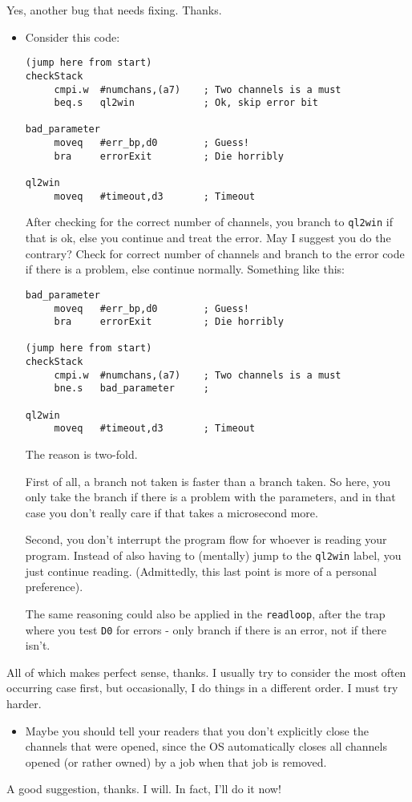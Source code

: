 Yes, another bug that needs fixing. Thanks.
\begin{itemize}
\item Consider this code:
\begin{lstlisting}
(jump here from start)
checkStack
     cmpi.w  #numchans,(a7)    ; Two channels is a must
     beq.s   ql2win            ; Ok, skip error bit

bad_parameter
     moveq   #err_bp,d0        ; Guess!
     bra     errorExit         ; Die horribly

ql2win
     moveq   #timeout,d3       ; Timeout
\end{lstlisting}

After checking for the correct number of channels, you branch to \texttt{ql2win}
if that is ok, else you continue and treat the error. May I suggest
you do the contrary? Check for correct number of channels and branch
to the error code if there is a problem, else continue normally. Something
like this:
\begin{lstlisting}
bad_parameter
     moveq   #err_bp,d0        ; Guess!
     bra     errorExit         ; Die horribly

(jump here from start)
checkStack
     cmpi.w  #numchans,(a7)    ; Two channels is a must
     bne.s   bad_parameter     ;

ql2win
     moveq   #timeout,d3       ; Timeout
\end{lstlisting}

The reason is two-fold.

First of all, a branch not taken is faster than a branch taken. So
here, you only take the branch if there is a problem with the parameters,
and in that case you don't really care if that takes a microsecond
more.

Second, you don't interrupt the program flow for whoever is reading
your program. Instead of also having to (mentally) jump to the \texttt{ql2win}
label, you just continue reading. (Admittedly, this last point is
more of a personal preference).

The same reasoning could also be applied in the \texttt{readloop},
after the trap where you test \texttt{D0} for errors - only branch
if there is an error, not if there isn't.
\end{itemize}
All of which makes perfect sense, thanks. I usually try to consider
the most often occurring case first, but occasionally, I do things
in a different order. I must try harder.
\begin{itemize}
\item Maybe you should tell your readers that you don't explicitly close
the channels that were opened, since the OS automatically closes all
channels opened (or rather owned) by a job when that job is removed.
\end{itemize}
A good suggestion, thanks. I will. In fact, I'll do it now!


